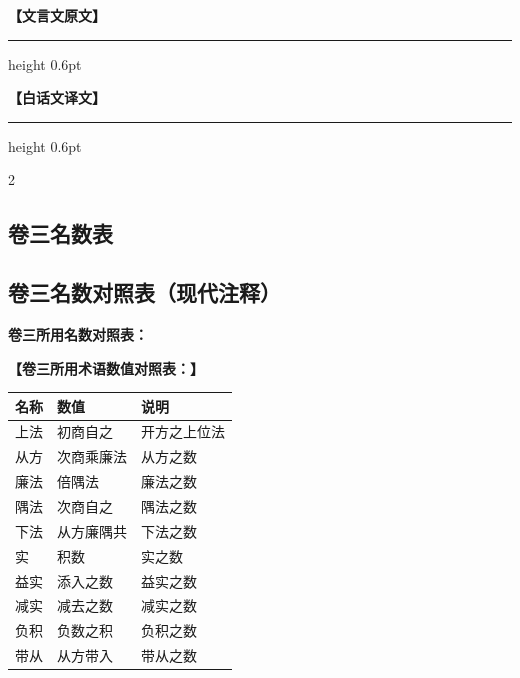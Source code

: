\documentclass[11pt,a4paper]{article}
\newcommand{\colheaders}{%
  \noindent\begin{minipage}[t]{0.48\textwidth}\centering
    \textbf{\color{classicalframe}【文言文原文】}
    \vspace{0.3em}
    \hrule height 0.6pt
  \end{minipage}%
  \hfill
  \begin{minipage}[t]{0.48\textwidth}\centering
    \textbf{\color{modernframe}【白话文译文】}
    \vspace{0.3em}
    \hrule height 0.6pt
  \end{minipage}
  \par\medskip
}
\begin{document}
\clearpage
\colheaders
\begin{paracol}{2}

\subsection*{卷三名数表}

\switchcolumn
\subsection*{卷三名数对照表（现代注释）}

\switchcolumn*

\noindent
\textbf{卷三所用名数对照表：}

\switchcolumn
\noindent
\textbf{【卷三所用术语数值对照表：】}

\switchcolumn*

\begin{center}
\begin{tabular}{|l|l|l|}
\hline
\textbf{名称} & \textbf{数值} & \textbf{说明} \\
\hline
上法 & 初商自之 & 开方之上位法 \\
\hline
从方 & 次商乘廉法 & 从方之数 \\
\hline
廉法 & 倍隅法 & 廉法之数 \\
\hline
隅法 & 次商自之 & 隅法之数 \\
\hline
下法 & 从方廉隅共 & 下法之数 \\
\hline
实 & 积数 & 实之数 \\
\hline
益实 & 添入之数 & 益实之数 \\
\hline
减实 & 减去之数 & 减实之数 \\
\hline
负积 & 负数之积 & 负积之数 \\
\hline
带从 & 从方带入 & 带从之数 \\
\hline
\end{tabular}
\end{center}

\switchcolumn


\end{paracol}
\end{document}
